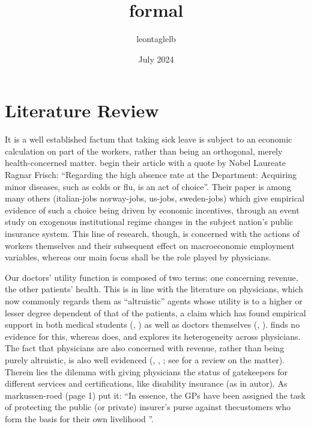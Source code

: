 \documentclass{article}
\title{formal}
\author{leontaglelb }
\date{July 2024}
\begin{document}
\maketitle

\section{Literature Review}


It is a well established factum that taking sick leave is subject to an economic calculation on part of the workers, rather than being an orthogonal, merely health-concerned matter. \cite{JohanssonPalme} begin their article with a quote by Nobel Laureate Ragnar Frisch: ``Regarding the high absence rate at the Department: Acquiring minor diseases, such as colds or flu, is an act of choice''. Their paper is among many others (italian-jobs
norway-jobs, us-jobs, sweden-jobs) which give empirical evidence of such a choice being driven by economic incentives, through an event study on exogenous institutional regime changes in the subject nation's public insurance system. This line of research, though, is concerned with the actions of workers themselves and their subsequent effect on macroeconomic employment variables, whereas our main focus shall be the role played by physicians.

Our doctors' utility function is composed of two terms: one concerning revenue, the other patients' health. This is in line with the literature on physicians, which now commonly regards them as ``altruistic'' agents whose utility is to a higher or lesser degree dependent of that of the patients, a claim which has found empirical support in both medical students (\cite{avengers}, \cite{hs-wiesen}) as well as doctors themselves (\cite{hippocrates}, \cite{brosigkoch}). \cite{crea2019physician} finds no evidence for this, whereas \cite{godager2013profit} does, and explores its heterogeneity across physicians. The fact that physicians are also concerned with revenue, rather than being purely altruistic, is also well evidenced (\cite{clemensgottlieb}, \cite{HSW}, \cite{autor}; see \cite{rrk2012} for a review on the matter). Therein lies the dilemma with giving physicians the status of gatekeepers for different services and certifications, like disability insurance (as in autor). As markussen-roed (page 1) put it: ``In essence, the GPs have been assigned the task of protecting the public (or private) insurer's purse against thecustomers who form the basis for their own livelihood ''.

	 

\end{document}
